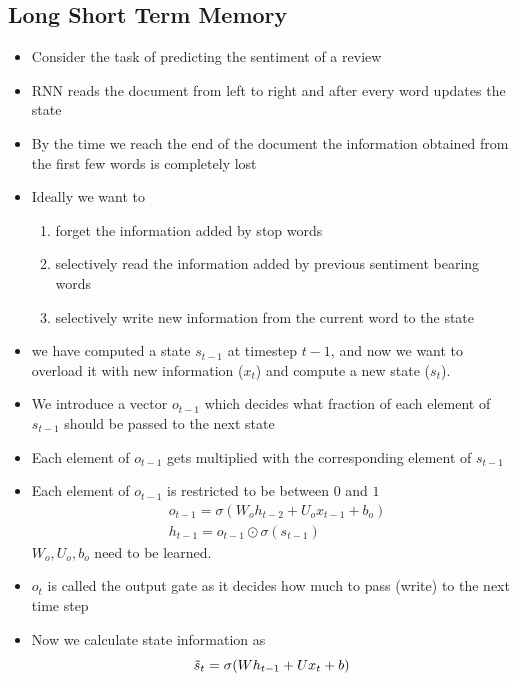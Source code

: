 \documentclass[a4paper]{article}
\begin{document}
\subsection{Long Short Term Memory}
\begin{itemize}
    \item Consider the task of predicting the sentiment of a review
    \item RNN reads the document from left to right and after every word updates the state
    \item By the time we reach the end of the document the information obtained from the first few words is completely lost
    \item Ideally we want to
    \begin{enumerate}
        \item forget the information added by stop words
        \item selectively read the information added by
        previous sentiment bearing words
        \item selectively write new information from the current word to the state
    \end{enumerate}
    \item we have computed a state $s_{t-1}$ at timestep $t - 1$, and now we want to overload it with new information ($x_t$) and compute a new state ($s_t$).
    \item We introduce a vector $o_{t-1}$ which decides what fraction of each element of $s_{t-1}$ should be passed to the next state
    \item Each element of $o_{t-1}$ gets multiplied with the corresponding element of $s_{t-1}$
    \item Each element of $o_{t-1}$ is restricted to be between $0$ and $1$
    \begin{equation*}
        \begin{split}
            &o_{t-1}=\sigma(W_oh_{t-2}+U_ox_{t-1}+b_o)\\
            &h_{t-1}=o_{t-1}\odot \sigma(s_{t-1})
        \end{split}
    \end{equation*}
    $W_o,U_o,b_o$ need to be learned.
    \item $o_t$ is called the output gate as it decides how much to pass (write) to the next time step
    \item Now we calculate state information as
    \begin{equation*}
        \Tilde{s}_t=\sigma(Wh_{t-1}+Ux_t+b)
    \end{equation*}

\end{itemize}
\end{document}
